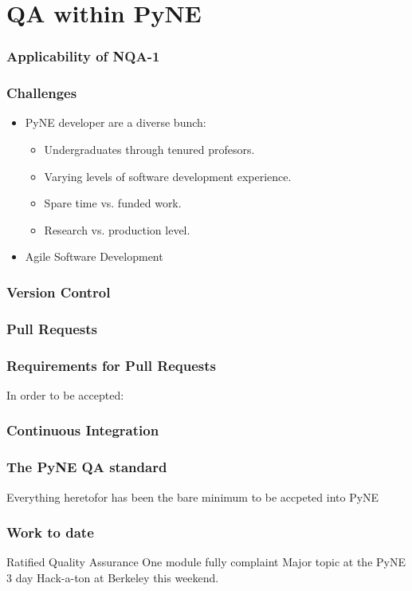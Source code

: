 \documentclass[12pt]{beamer}
\begin{document}
\section{QA within PyNE}

\begin{frame}
\frametitle{Applicability of NQA-1}

\end{frame}


\begin{frame}[fragile]
\frametitle{Challenges}

\begin{itemize}
\item{PyNE developer are a diverse bunch}:
   \begin{itemize}
   \item{Undergraduates through tenured profesors.}
   \item{Varying levels of software development experience.}
   \item{Spare time vs. funded work.}
   \item{Research vs. production level.}
   \end{itemize}
\item{Agile Software Development}
\end{itemize}

\end{frame}


\begin{frame}
\frametitle{Version Control}
\end{frame}

\begin{frame}
\frametitle{Pull Requests}
\end{frame}

\begin{frame}
\frametitle{Requirements for Pull Requests}
In order to be accepted:

\end{frame}



\begin{frame}
\frametitle{Continuous Integration}
\end{frame}


\begin{frame}
\frametitle{The PyNE QA standard}
Everything heretofor has been the bare minimum to be accpeted into PyNE
\end{frame}


\begin{frame}
\frametitle{Work to date}

Ratified Quality Assurance
One module fully complaint
Major topic at the PyNE 3 day Hack-a-ton at Berkeley this weekend.

\end{frame}
\end{document}

